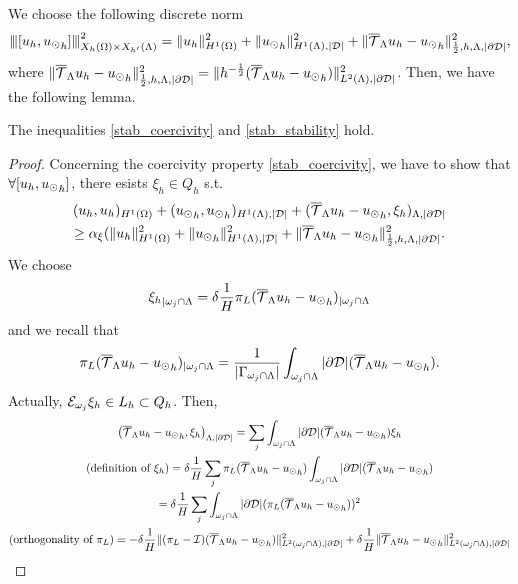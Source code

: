 We choose the following discrete norm
\begin{equation*}
{\left\vert\kern-0.25ex\left\vert\kern-0.25ex\left\vert [u_h, {u_{\odot}}_h] \right\vert\kern-0.25ex\right\vert\kern-0.25ex\right\vert}^2_{X_h(\Omega)\times X_{h'}(\Lambda) }
= \|u_h\|^2_{H^1(\Omega)}+\|{u_{\odot}}_h\|^2_{H^1(\Lambda),|\mathcal{D}|} + \|{\overline{\mathcal{T}}_\Lambda} u_h - {u_{\odot}}_h\|^2_{\frac 12, h, \Lambda, |\partial\mathcal{D}|},
\end{equation*}
where $\|{\overline{\mathcal{T}}_\Lambda} u_h - {u_{\odot}}_h\|^2_{\frac 12, h, \Lambda, |\partial\mathcal{D}|} = \|h^{-\frac 12} ({\overline{\mathcal{T}}_\Lambda} u_h - {u_{\odot}}_h)\|^2_{L^2(\Lambda), |\partial\mathcal{D}|} $. Then, we have the following lemma. 
\begin{lemma}
The inequalities \eqref{stab_coercivity} and \eqref{stab_stability} hold.
\end{lemma}
\begin{proof} 
Concerning the coercivity property \eqref{stab_coercivity}, we have to show that $\forall [u_h, {u_{\odot}}_h]$, there esists $\xi_h \in Q_h$ s.t.
\begin{multline*}
(u_h,u_h)_{H^1(\Omega)}+ ({u_{\odot}}_h, {u_{\odot}}_h)_{H^1(\Lambda), |\mathcal{D}|} +   ({\overline{\mathcal{T}}_\Lambda} u_h - {u_{\odot}}_h, \xi_h)_{\Lambda,|\partial\mathcal{D}|} \\
\geq \alpha_{\xi}(\|u_h\|^2_{H^1(\Omega)}+\|{u_{\odot}}_h\|^2_{H^1(\Lambda),|\mathcal{D}|}+ \|{\overline{\mathcal{T}}_\Lambda} u_h - {u_{\odot}}_h\|^2_{\frac 12, h, \Lambda, |\partial\mathcal{D}|}.
\end{multline*}
We choose 
\begin{equation*}
{\xi_h}_{|\omega _j\cap \Lambda}=\delta \frac 1H \pi_L({\overline{\mathcal{T}}_\Lambda} u_h-{u_{\odot}}_h)_{|\omega _j \cap \Lambda}
\end{equation*}
and we recall that 
\begin{equation*}
\pi_L({\overline{\mathcal{T}}_\Lambda} u_h-{u_{\odot}}_h)_{|\omega _j \cap \Lambda}=\frac{1}{|\Gamma_{\omega _j\cap \Lambda}|}\int_{\omega _j\cap \Lambda}|\partial\mathcal{D}| ({\overline{\mathcal{T}}_\Lambda} u_h- {u_{\odot}}_h).
\end{equation*} 
Actually, $\mathcal{E}_{\omega _j}\xi_h\in L_h \subset Q_h$. Then,
\begin{multline*}
\left( \mtrace u_h - {\ud}_h, \xi _h \right)_{\Lambda,|\DD|} 
= \sum_j \int_{\patch\cap \Lambda} |\DD|(\mtrace u_h - {\ud}_h)\xi_h
\\
(\text{definition of $\xi_h$})= \delta \frac{1}{H}\sum_j \pi_L( \mtrace u_h - {\ud}_h)\int_{\patch\cap \Lambda} |\DD|(\mtrace u_h - {\ud}_h)
\\
= \delta \frac{1}{H} \sum_j \int_{\patch\cap \Lambda}|\DD| (\pi_L( \mtrace u_h - {\ud}_h) )^2
\\
(\text{orthogonality of $\pi_L$}) = - \delta \frac{1}{H} \|(\pi_L-\mathcal{I})(\mtrace u_h - {\ud}_h)\|^2_{L^2(\patch\cap \Lambda),|\DD|} + \delta \frac{1}{H} \|\mtrace u_h - {\ud}_h\|^2_{L^2(\patch\cap \Lambda),|\DD|}

\end{multline*}
\end{proof}
